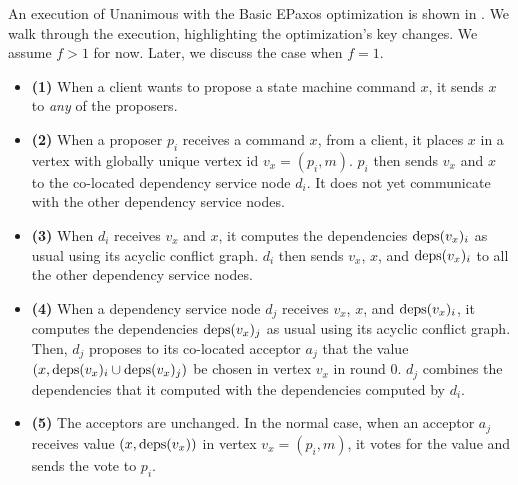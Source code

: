 An execution of Unanimous \BPaxos{} with the Basic EPaxos optimization is shown
in . We walk through the execution, highlighting the
optimization's key changes. We assume $f > 1$ for now. Later, we discuss the
case when $f = 1$.
\begin{itemize}
  \item \textbf{(1)}
    When a client wants to propose a state machine command $x$, it sends $x$ to
    \emph{any} of the proposers.

  \item \textbf{(2)}
    When a proposer $p_i$ receives a command $x$, from a client, it places $x$
    in a vertex with globally unique vertex id $v_x = (p_i, m)$.
    \change{} $p_i$ then sends $v_x$ and $x$ to the co-located dependency
    service node $d_i$. It does not yet communicate with the other dependency
    service nodes.

  \item \textbf{(3)}
    \change{} When $d_i$ receives $v_x$ and $x$, it computes the
    dependencies $\text{deps}(v_x)_i$ as usual using its acyclic conflict graph.
    $d_i$ then sends $v_x$, $x$, and $\text{deps}(v_x)_i$ to all the other dependency
    service nodes.

  \item \textbf{(4)}
    When a dependency service node $d_j$ receives $v_x$, $x$, and
    $\text{deps}(v_x)_i$, it computes the dependencies $\text{deps}(v_x)_j$ as usual using
    its acyclic conflict graph. \change{} Then, $d_j$ proposes to its
    co-located acceptor $a_j$ that the value $(x, \text{deps}(v_x)_i \cup
    \text{deps}(v_x)_j)$ be chosen in vertex $v_x$ in round $0$. $d_j$ combines the
    dependencies that it computed with the dependencies computed by $d_i$.

  \item \textbf{(5)}
    The acceptors are unchanged. In the normal case, when an acceptor $a_j$
    receives value $(x, \text{deps}(v_x))$ in vertex $v_x = (p_i, m)$, it votes for
    the value and sends the vote to $p_i$.


\end{itemize}
